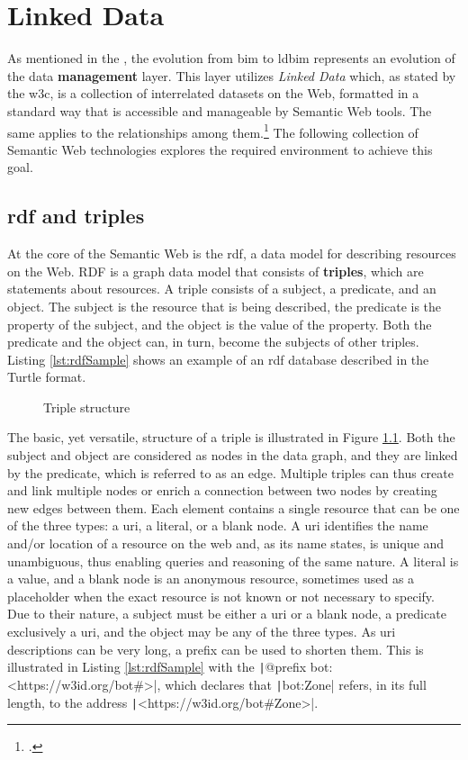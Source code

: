 \chapter{Linked Data} \label{ch:linkedData}
As mentioned in the , the evolution from \ac{bim} to \ac{ldbim} represents an evolution of the data \textbf{management} layer. This layer utilizes \emph{Linked Data} which, as stated by the \ac{w3c}, is a collection of interrelated datasets on the Web, formatted in a standard way that is accessible and manageable by Semantic Web tools. The same applies to the relationships among them.\footcite{w3c} The following collection of Semantic Web technologies explores the required environment to achieve this goal.

\section{\acs{rdf} and triples} \label{subsec:rdfAndTriples}
At the core of the Semantic Web is the \ac{rdf}, a data model for describing resources on the Web. RDF is a graph data model that consists of \textbf{triples}, which are statements about resources. A triple consists of a subject, a predicate, and an object. The subject is the resource that is being described, the predicate is the property of the subject, and the object is the value of the property. Both the predicate and the object can, in turn, become the subjects of other triples. Listing \ref{lst:rdfSample} shows an example of an \ac{rdf} database described in the Turtle format.

\begin{figure}[H]
    \centering
    
    \caption{Triple structure}
    \label{fig:triple}
\end{figure}

The basic, yet versatile, structure of a triple is illustrated in Figure \ref{fig:triple}. Both the subject and object are considered as nodes in the data graph, and they are linked by the predicate, which is referred to as an edge. Multiple triples can thus create and link multiple nodes or enrich a connection between two nodes by creating new edges between them. Each element contains a single resource that can be one of the three types: a \acs{uri}, a literal, or a blank node. A \ac{uri} identifies the name and/or location of a resource on the web and, as its name states, is unique and unambiguous, thus enabling queries and reasoning of the same nature. A literal is a value, and a blank node is an anonymous resource, sometimes used as a placeholder when the exact resource is not known or not necessary to specify. Due to their nature, a subject must be either a \ac{uri} or a blank node, a predicate exclusively a \ac{uri}, and the object may be any of the three types. As \ac{uri} descriptions can be very long, a prefix can be used to shorten them. This is illustrated in Listing \ref{lst:rdfSample} with the \texttt|@prefix bot: <https://w3id.org/bot#>|, which declares that \texttt|bot:Zone| refers, in its full length, to the address \texttt|<https://w3id.org/bot#Zone>|.

